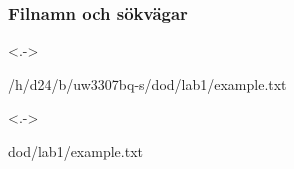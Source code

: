 



\begin{frame}[fragile,t]
    \frametitle{Filnamn och sökvägar}

    \begin{itemize}
    \end{itemize}

    \blankline
    \begin{onlyenv}<.->
        \begin{GobbleCode}{6}
            /h/d24/b/uw3307bq-s/dod/lab1/example.txt
        \end{GobbleCode}
    \end{onlyenv}

    \begin{onlyenv}<.->
        \begin{GobbleCode}{6}
            dod/lab1/example.txt
        \end{GobbleCode}
    \end{onlyenv}

\end{frame}




